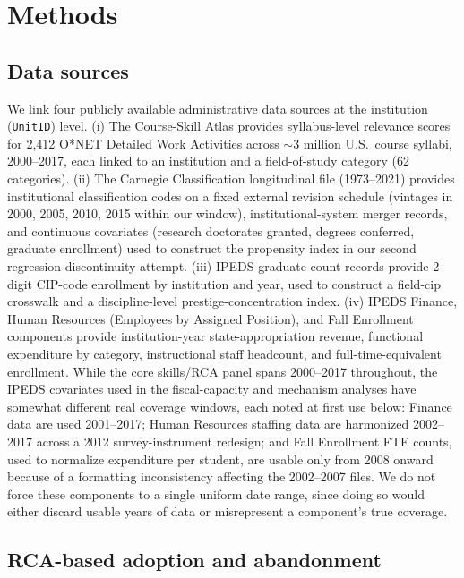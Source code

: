 \documentclass[11pt, letterpaper]{article}
\newcommand{\parencite}[1]{\cite{#1}}
\begin{document}
\section*{Methods}

\subsection*{Data sources}

We link four publicly available administrative data sources at the institution (\texttt{UnitID}) level. (i) The Course-Skill Atlas \parencite{javadiansabet2024} provides syllabus-level relevance scores for 2,412 O*NET Detailed Work Activities across $\sim$3 million U.S.\ course syllabi, 2000--2017, each linked to an institution and a field-of-study category (62 categories). (ii) The Carnegie Classification longitudinal file (1973--2021) provides institutional classification codes on a fixed external revision schedule (vintages in 2000, 2005, 2010, 2015 within our window), institutional-system merger records, and continuous covariates (research doctorates granted, degrees conferred, graduate enrollment) used to construct the propensity index in our second regression-discontinuity attempt. (iii) IPEDS graduate-count records provide 2-digit CIP-code enrollment by institution and year, used to construct a field-cip crosswalk and a discipline-level prestige-concentration index. (iv) IPEDS Finance, Human Resources (Employees by Assigned Position), and Fall Enrollment components provide institution-year state-appropriation revenue, functional expenditure by category, instructional staff headcount, and full-time-equivalent enrollment. While the core skills/RCA panel spans 2000--2017 throughout, the IPEDS covariates used in the fiscal-capacity and mechanism analyses have somewhat different real coverage windows, each noted at first use below: Finance data are used 2001--2017; Human Resources staffing data are harmonized 2002--2017 across a 2012 survey-instrument redesign; and Fall Enrollment FTE counts, used to normalize expenditure per student, are usable only from 2008 onward because of a formatting inconsistency affecting the 2002--2007 files. We do not force these components to a single uniform date range, since doing so would either discard usable years of data or misrepresent a component's true coverage.

\subsection*{RCA-based adoption and abandonment}
\end{document}
